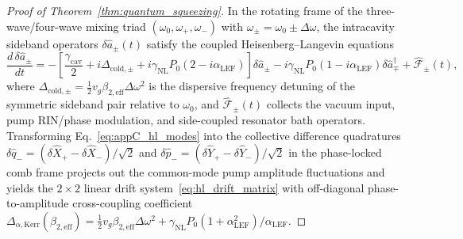 \documentclass[11pt,letterpaper]{article}
\theoremstyle{definition}
\theoremstyle{remark}
\begin{document}
\begin{proof}[Proof of Theorem~\ref{thm:quantum_squeezing}]
In the rotating frame of the three-wave/four-wave mixing triad $(\omega_0, \omega_+, \omega_-)$ with $\omega_\pm = \omega_0 \pm \Delta\omega$, the intracavity sideband operators $\delta\hat{a}_\pm(t)$ satisfy the coupled Heisenberg--Langevin equations
\begin{equation}
\frac{d\,\delta\hat{a}_\pm}{dt} = -\left[\frac{\gamma_{\mathrm{cav}}}{2} + i\Delta_{\mathrm{cold},\pm} + i\gamma_{\mathrm{NL}}P_0(2 - i\alpha_{\mathrm{LEF}})\right]\delta\hat{a}_\pm - i\gamma_{\mathrm{NL}}P_0(1 - i\alpha_{\mathrm{LEF}})\delta\hat{a}_\mp^\dagger + \hat{\mathcal{F}}_\pm(t),
\label{eq:appC_hl_modes}
\end{equation}
where $\Delta_{\mathrm{cold},\pm} = \frac{1}{2}v_g \beta_{2,\mathrm{eff}}\Delta\omega^2$ is the dispersive frequency detuning of the symmetric sideband pair relative to $\omega_0$, and $\hat{\mathcal{F}}_\pm(t)$ collects the vacuum input, pump RIN/phase modulation, and side-coupled resonator bath operators. Transforming Eq.~\eqref{eq:appC_hl_modes} into the collective difference quadratures $\delta\hat{q}_- = (\delta\hat{X}_+ - \delta\hat{X}_-)/\sqrt{2}$ and $\delta\hat{p}_- = (\delta\hat{Y}_+ - \delta\hat{Y}_-)/\sqrt{2}$ in the phase-locked comb frame projects out the common-mode pump amplitude fluctuations and yields the $2\times 2$ linear drift system~\eqref{eq:hl_drift_matrix} with off-diagonal phase-to-amplitude cross-coupling coefficient $\Delta_{\alpha,\mathrm{Kerr}}(\beta_{2,\mathrm{eff}}) = \frac{1}{2}v_g \beta_{2,\mathrm{eff}}\Delta\omega^2 + \gamma_{\mathrm{NL}}P_0(1 + \alpha_{\mathrm{LEF}}^2)/\alpha_{\mathrm{LEF}}$.


\end{proof}
\end{document}
